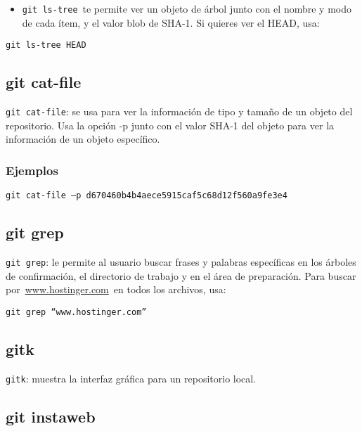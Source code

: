 \documentclass[
  a2paper,
]{article}
\providecommand{\tightlist}{%
  \setlength{\itemsep}{0pt}\setlength{\parskip}{0pt}}\usepackage{longtable,booktabs,array}
\begin{document}
\begin{itemize}
\tightlist
\item
  \texttt{git\ ls-tree}~te permite ver un objeto de árbol junto con el
  nombre y modo de cada ítem, y el valor blob de SHA-1. Si quieres ver
  el HEAD, usa:
\end{itemize}

\texttt{git\ ls-tree\ HEAD}

\hypertarget{git-cat-file}{%
\subsection{git cat-file}\label{git-cat-file}}

\texttt{git\ cat-file}: se usa para ver la información de tipo y tamaño
de un objeto del repositorio. Usa la opción -p junto con el valor SHA-1
del objeto para ver la información de un objeto específico.

\hypertarget{ejemplos-7}{%
\subsubsection{Ejemplos}\label{ejemplos-7}}

\texttt{git\ cat-file\ –p\ d670460b4b4aece5915caf5c68d12f560a9fe3e4}

\hypertarget{git-grep}{%
\subsection{git grep}\label{git-grep}}

\texttt{git\ grep}: le permite al usuario buscar frases y palabras
específicas en los árboles de confirmación, el directorio de trabajo y
en el área de preparación. Para buscar
por~\href{http://www.hostinger.com/}{www.hostinger.com}~en todos los
archivos, usa:

\texttt{git\ grep\ “www.hostinger.com”}

\hypertarget{gitk}{%
\subsection{gitk}\label{gitk}}

\texttt{gitk}: muestra la interfaz gráfica para un repositorio local.

\hypertarget{git-instaweb}{%
\subsection{git instaweb}\label{git-instaweb}}
\end{document}
